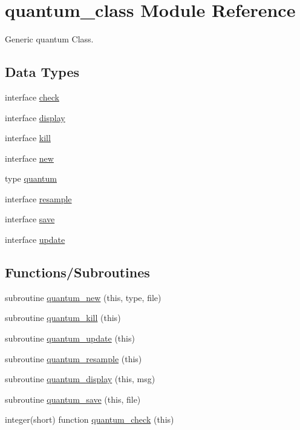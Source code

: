 \hypertarget{namespacequantum__class}{}\section{quantum\+\_\+class Module Reference}
\label{namespacequantum__class}


Generic quantum Class.  


\subsection*{Data Types}
\begin{DoxyCompactItemize}
\item 
interface \hyperlink{interfacequantum__class_1_1check}{check}
\item 
interface \hyperlink{interfacequantum__class_1_1display}{display}
\item 
interface \hyperlink{interfacequantum__class_1_1kill}{kill}
\item 
interface \hyperlink{interfacequantum__class_1_1new}{new}
\item 
type \hyperlink{structquantum__class_1_1quantum}{quantum}
\item 
interface \hyperlink{interfacequantum__class_1_1resample}{resample}
\item 
interface \hyperlink{interfacequantum__class_1_1save}{save}
\item 
interface \hyperlink{interfacequantum__class_1_1update}{update}
\end{DoxyCompactItemize}
\subsection*{Functions/\+Subroutines}
\begin{DoxyCompactItemize}
\item 
subroutine \hyperlink{namespacequantum__class_a3170f42702712b16bcc152509752f18e}{quantum\+\_\+new} (this, type, file)
\item 
subroutine \hyperlink{namespacequantum__class_a1c73725245a04e63092d2152579c4bd9}{quantum\+\_\+kill} (this)
\item 
subroutine \hyperlink{namespacequantum__class_afef9cff48e6cd580f47a06f4adc4109b}{quantum\+\_\+update} (this)
\item 
subroutine \hyperlink{namespacequantum__class_a496266b0eb772dd0e7d8ce9d8439945a}{quantum\+\_\+resample} (this)
\item 
subroutine \hyperlink{namespacequantum__class_a163174aa7cc6ae0a03b2269c55ca05b8}{quantum\+\_\+display} (this, msg)
\item 
subroutine \hyperlink{namespacequantum__class_aa60138cf5e19494d1f29b63053b32f24}{quantum\+\_\+save} (this, file)
\item 
integer(short) function \hyperlink{namespacequantum__class_a7ed38fd0b1d221dd04ca645722602f7d}{quantum\+\_\+check} (this)
\end{DoxyCompactItemize}


